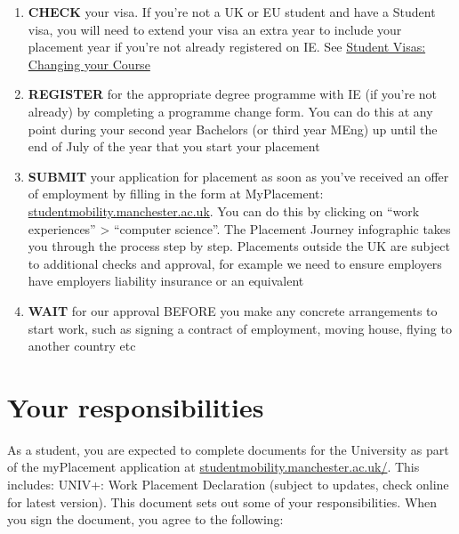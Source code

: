 \documentclass[
]{book}
\providecommand{\tightlist}{%
  \setlength{\itemsep}{0pt}\setlength{\parskip}{0pt}}
\begin{document}
\begin{enumerate}
\def\labelenumi{\arabic{enumi}.}
\tightlist
\item
  \textbf{CHECK} your visa. If you're not a UK or EU student and have a Student visa, you will need to extend your visa an extra year to include your placement year if you're not already registered on IE. See \href{documents.manchester.ac.uk/display.aspx?DocID=37044}{Student Visas: Changing your Course} \citep{changing}
\item
  \textbf{REGISTER} for the appropriate degree programme with IE (if you're not already) by completing a programme change form. You can do this at any point during your second year Bachelors (or third year MEng) up until the end of July of the year that you start your placement
\item
  \textbf{SUBMIT} your application for placement as soon as you've received an offer of employment by filling in the form at MyPlacement: \href{https://studentmobility.manchester.ac.uk}{studentmobility.manchester.ac.uk}. You can do this by clicking on ``work experiences'' \textgreater{} ``computer science''. The Placement Journey infographic takes you through the process step by step. Placements outside the UK are subject to additional checks and approval, for example we need to ensure employers have employers liability insurance or an equivalent
\item
  \textbf{WAIT} for our approval BEFORE you make any concrete arrangements to start work, such as signing a contract of employment, moving house, flying to another country etc
\end{enumerate}

\chapter{Your responsibilities}\label{you}

As a student, you are expected to complete documents for the University as part of the myPlacement application at \href{https://studentmobility.manchester.ac.uk/}{studentmobility.manchester.ac.uk/}. This includes: UNIV+: Work Placement Declaration (subject to updates, check online for latest version). This document sets out some of your responsibilities. When you sign the document, you agree to the following:
\end{document}
